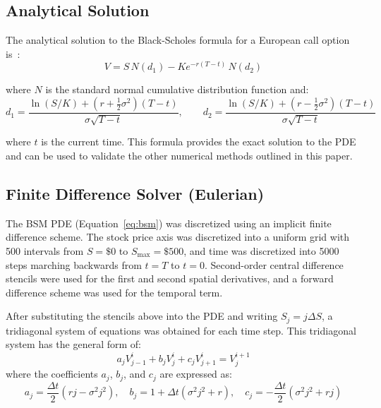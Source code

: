 \documentclass[12pt, onecolumn, journal]{IEEEtran}
\begin{document}
\subsection{Analytical Solution}
The analytical solution to the Black-Scholes formula for a European call option is~\cite{BlackScholes1973, Hull2022}:
\begin{equation}
    V = S\,N(d_1) - Ke^{-r(T-t)}\,N(d_2)
\end{equation}

where $N$ is the standard normal cumulative distribution function and:
\begin{equation}
    d_1 = \frac{\ln(S/K) + (r + \frac{1}{2}\sigma^2)(T-t)}{\sigma\sqrt{T-t}}, \qquad d_2 = \frac{\ln(S/K) + (r - \frac{1}{2}\sigma^2)(T-t)}{\sigma\sqrt{T-t}}
\end{equation}

where $t$ is the current time. This formula provides the exact solution to the PDE and can be used to validate the other numerical methods outlined in this paper.

\subsection{Finite Difference Solver (Eulerian)}
The BSM PDE (Equation~\ref{eq:bsm}) was discretized using an implicit finite difference scheme. The stock price axis was discretized into a uniform grid with 500 intervals from $S = \$0$ to $S_{\max} = \$500$, and time was discretized into 5000 steps marching backwards from $t = T$ to $t = 0$. Second-order central difference stencils were used for the first and second spatial derivatives, and a forward difference scheme was used for the temporal term. 

After substituting the stencils above into the PDE and writing $S_j = j \Delta S$, a tridiagonal system of equations was obtained for each time step. This tridiagonal system has the general form of:
\begin{equation}
    a_j V_{j-1}^i + b_j V_j^i + c_j V_{j+1}^i = V_j^{i+1}
\end{equation}
where the coefficients $a_j$, $b_j$, and $c_j$ are expressed as:
\begin{equation}
    a_j = \frac{\Delta t}{2}\left(rj - \sigma^2 j^2\right), \quad b_j = 1 + \Delta t\left(\sigma^2 j^2 + r\right), \quad c_j = -\frac{\Delta t}{2}\left(\sigma^2 j^2 + rj\right)
\end{equation}
\end{document}
